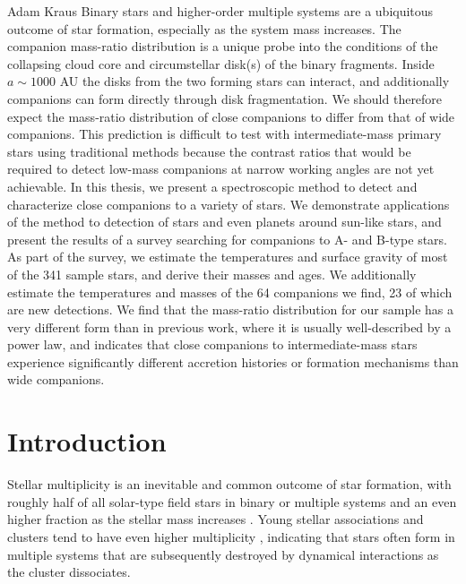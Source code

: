 \documentclass{utthesis}
\begin{document}
%
%

\begin{UTabstract}{Adam Kraus}
Binary stars and higher-order multiple systems are a ubiquitous outcome of star formation, especially as the system mass increases. The companion mass-ratio distribution is a unique probe into the conditions of the collapsing cloud core and circumstellar disk(s) of the binary fragments. Inside $a \sim 1000$ AU the disks from the two forming stars can interact, and additionally companions can form directly through disk fragmentation. We should therefore expect the mass-ratio distribution of close companions to differ from that of wide companions. This prediction is difficult to test with intermediate-mass primary stars using traditional methods because the contrast ratios that would be required to detect low-mass companions at narrow working angles are not yet achievable. In this thesis, we present a spectroscopic method to detect and characterize close companions to a variety of stars. We demonstrate applications of the method to detection of stars and even planets around sun-like stars, and present the results of a survey searching for companions to A- and B-type stars. As part of the survey, we estimate the temperatures and surface gravity of most of the 341 sample stars, and derive their masses and ages. We additionally estimate the temperatures and masses of the 64 companions we find, 23 of which are new detections. We find that the mass-ratio distribution for our sample has a very different form than in previous work, where it is usually well-described by a power law, and indicates that close companions to intermediate-mass stars experience significantly different accretion histories or formation mechanisms than wide companions.
\end{UTabstract}


\tableofcontents

\listoffigures


\mainmatter

\chapter{Introduction}

Stellar multiplicity is an inevitable and common outcome of star formation, with roughly half of all solar-type field stars in binary or multiple systems \citep{Raghavan2010} and an even higher fraction as the stellar mass increases \citep{Zinnecker2007}. Young stellar associations and clusters tend to have even higher multiplicity \citep{Duchene2013}, indicating that stars often form in multiple systems that are subsequently destroyed by dynamical interactions as the cluster dissociates. 
\end{document}
